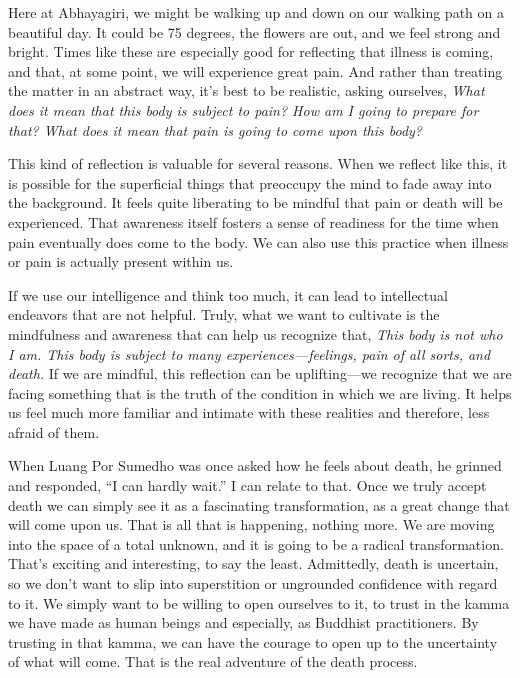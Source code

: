 Here at Abhayagiri, we might be walking up and down on our walking path 
on a beautiful day. It could be 75 degrees, the flowers are out, and we 
feel strong and bright. Times like these are especially good for 
reflecting that illness is coming, and that, at some point, we will 
experience great pain. And rather than treating the matter in an 
abstract way, it's best to be realistic, asking ourselves, \emph{What 
does it mean that this body is subject to pain? How am I going to 
prepare for that? What does it mean that pain is going to come upon 
this body?}

This kind of reflection is valuable for several reasons. When we reflect
like this, it is possible for the superficial things that preoccupy the
mind to fade away into the background. It feels quite liberating to be
mindful that pain or death will be \mbox{experienced.} That awareness
itself fosters a sense of readiness for the time when pain eventually
does come to the body. We can also use this practice when illness or
pain is actually present within us.

If we use our intelligence and think too much, it can lead to 
intellectual endeavors that are not helpful. Truly, what we want to 
cultivate is the mindfulness and awareness that can help us recognize 
that, \emph{This body is not who I am. This body is subject to many 
experiences---feelings, pain of all sorts, and death.} If we are 
mindful, this reflection can be uplifting---we recognize that we are 
facing something that is the truth of the condition in which we are 
living. It helps us feel much more familiar and intimate with these 
realities and therefore, less afraid of them.

When Luang Por Sumedho was once asked how he feels about death, he 
grinned and responded, ``I can hardly wait.'' I can relate to that. 
Once we truly accept death we can simply see it as a fascinating 
transformation, as a great change that will come upon us. That is all 
that is happening, nothing more. We are moving into the space of a 
total unknown, and it is going to be a radical transformation. That's 
exciting and interesting, to say the least. Admittedly, death is 
uncertain, so we don't want to slip into superstition or ungrounded 
confidence with regard to it. We simply want to be willing to open 
ourselves to it, to trust in the kamma we have made as human beings and 
especially, as Buddhist practitioners. By trusting in that kamma, we 
can have the courage to open up to the uncertainty of what will come. 
That is the real adventure of the death process.


